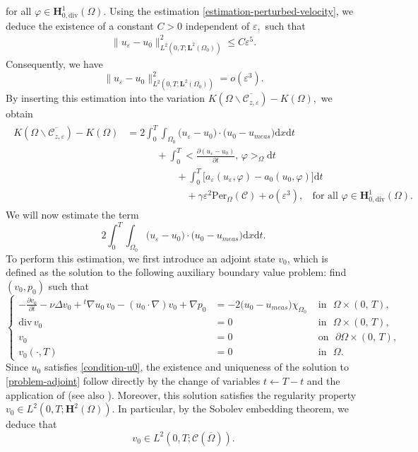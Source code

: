 \documentclass[a4paper,12pt,reqno,natbib]{amsart}
\newcommand{\dx} {\displaystyle\mathrm{d}x}
\newcommand{\dt} {\displaystyle\mathrm{d}t}
\def\H{\textbf{H}}
\def\L{\textbf{L}}
\begin{document}
for all $\varphi\in \H^1_{0,\text{div}}(\Omega).$ Using the estimation \eqref{estimation-perturbed-velocity}, we deduce the existence of a constant $C>0$ independent of $\varepsilon,$ such that
\begin{align*}
    \big\|
u_\varepsilon-u_0\big\|^2_{L^2(0,T;\L^2(\Omega_0))}\leq C\varepsilon^{5}.
\end{align*}
Consequently, we have
\begin{equation}
     \big\|
u_\varepsilon-u_0\big\|^2_{L^2(0,T;\L^2(\Omega_0))}=o(\varepsilon^3).
\end{equation}
By inserting this estimation into the variation $ K(\Omega\backslash\overline{\mathcal{C}_{z,\varepsilon}})-K(\Omega),$ we obtain 
\begin{align}
\begin{split}\label{as-cl}
 K(\Omega\backslash\overline{\mathcal{C}_{z,\varepsilon}})-K(\Omega)&=2\int_0^T \int_{\Omega_0}\big(u_\varepsilon-u_0\big)\cdot\big(u_0-u_{meas}\big) \dx\dt\\
 &\qquad\quad+\int_0^T\big<\frac{\partial (u_\varepsilon-u_0)}{\partial t},\, \varphi\big>_\Omega\dt\\
&\quad\qquad\qquad +\int_0^T \big[a_\varepsilon(u_\varepsilon,\varphi)-a_0(u_0,\varphi)\big]\dt\\
&\qquad\qquad\qquad +\gamma\varepsilon^{2}\text{Per}_\Omega(\mathcal{C})+o(\varepsilon^3),\;\;\text{ for all } \varphi\in \H^1_{0,\text{div}}(\Omega) .
\end{split}
\end{align}
We will now estimate the term $$\displaystyle2\int_0^T \int_{\Omega_0}\big(u_\varepsilon-u_0\big)\cdot\big(u_0-u_{meas}\big) \dx\dt.$$ 
To perform this estimation, we first introduce an adjoint state $v_0$, which is defined as the solution to the following auxiliary boundary value problem: find $(v_0,p_0)$ such that
\begin{equation}\label{problem-adjoint}
\left\{
\begin{array}{rll}
\displaystyle -\frac {\partial v_0}{\partial t}-\nu
\Delta v_0+{}^t\nabla u_0\,v_0- (u_0\cdot\nabla)v_0+ \nabla p_0
&= -2\big(u_0-u_{meas}\big)\chi_{\Omega_0} &\mbox{ in }  \,\,\Omega\times (0,\,T) ,\\
\mbox{div}\, v_0 &=  0 & \mbox{ in } \,\, \Omega \times (0,\,T) ,\\
v_0 &= 0 & \mbox{ on }\,\,  \partial\Omega \times (0,\,T) , \\
v_0(\cdot,T)&= 0&\mbox{ in } \,\,  \Omega.
\end{array}
 \right.
\end{equation}
Since \( u_0 \) satisfies \eqref{condition-u0}, the existence and uniqueness of the solution to \eqref{problem-adjoint} follow directly by the change of variables \( t \longleftarrow T - t \) and the application of \cite[Lemma 2.1]{imanuvilov2001remarks} (see also \cite{TemamBook1977}). Moreover, this solution satisfies the regularity property $v_0\in L^2(0,T;\H^2(\Omega))$. In particular, by the Sobolev embedding theorem, we deduce that
\begin{equation}\label{regularity2}
    v_0\in L^2(0,T;\mathcal{C}(\overline{\Omega})).
\end{equation}
\end{document}
